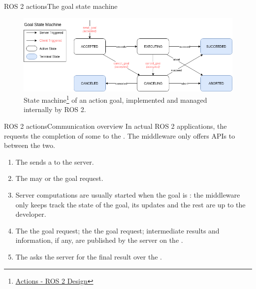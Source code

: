 \begin{frame}{ROS 2 actions}{The goal state machine}
  \begin{figure}
    \centering
    \includegraphics[width=\textwidth]{goalStateMachine.png}
    \caption{State machine\footnote{\href{http://design.ros2.org/articles/actions.html}{\color{blue}\underline{Actions - ROS 2 Design}}} of an action goal, implemented and managed internally by ROS 2.}
    \label{fig:goalStateMachine}
  \end{figure}
\end{frame}
\begin{frame}{ROS 2 actions}{Communication overview}
  In actual ROS 2 applications, the  requests the completion of some  to the . The middleware only offers APIs to  between the two.
  \begin{enumerate}
    \item The  sends a  to the server.
    \item The  may  or  the goal request.
    \item Server computations are usually started when the goal is : the middleware only keeps track the state of the goal, its updates and the rest are up to the developer.
    \item The  the goal request; the  the goal request; intermediate results and information, if any, are published by the server on the .
    \item The  asks the server for the final result over the .
  \end{enumerate}
\end{frame}
